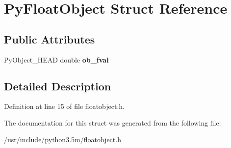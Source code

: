 \hypertarget{structPyFloatObject}{}\section{Py\+Float\+Object Struct Reference}
\label{structPyFloatObject}
\subsection*{Public Attributes}
\begin{DoxyCompactItemize}
\item 
Py\+Object\+\_\+\+H\+E\+AD double {\bfseries ob\+\_\+fval}\hypertarget{structPyFloatObject_ae7096f8767b95c9cf877f9c3cb03d4a2}{}\label{structPyFloatObject_ae7096f8767b95c9cf877f9c3cb03d4a2}

\end{DoxyCompactItemize}


\subsection{Detailed Description}


Definition at line 15 of file floatobject.\+h.



The documentation for this struct was generated from the following file\+:\begin{DoxyCompactItemize}
\item 
/usr/include/python3.\+5m/floatobject.\+h\end{DoxyCompactItemize}
